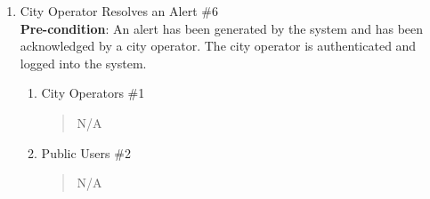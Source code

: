 \documentclass[]{article}
\begin{document}
\begin{enumerate}[{\bf BE6.}]
	\item City Operator Resolves an Alert \#6 \\      
    \textbf{Pre-condition}: An alert has been generated by the system and has been acknowledged by a city operator. The city operator is authenticated and logged into the system.
    
		\begin{enumerate}[{\bf VP1.}]
			\item City Operators \#1 
                \begin{quote}
                    N/A
                \end{quote}
                
			\item Public Users \#2 
				\begin{quote}
				    N/A
				\end{quote}
                

\end{enumerate}
\end{enumerate}
\end{document}
